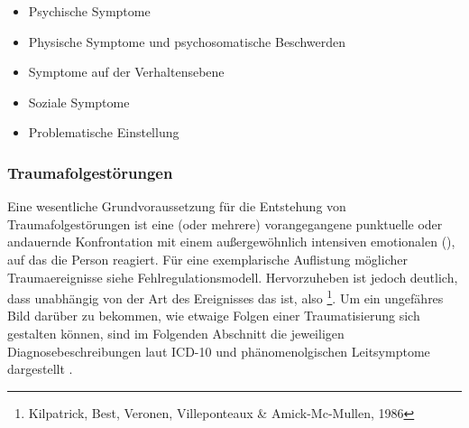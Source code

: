 {
\begin{itemize}
  \item {Psychische Symptome}
  \item {Physische Symptome und psychosomatische Beschwerden}
  \item {Symptome auf der Verhaltensebene}
  \item {Soziale Symptome}
  \item {Problematische Einstellung}
\end{itemize}
}
{}
{}
{}




\subsubsection{Traumafolgestörungen}


\Text{\TxBeschreibung}
{Eine wesentliche Grundvoraussetzung für die Entstehung von
Traumafolgestörungen ist eine (oder mehrere) vorangegangene
punktuelle oder andauernde Konfrontation mit einem
außergewöhnlich intensiven emotionalen
 (), auf das die Person  reagiert. 
Für eine
exemplarische Auflistung möglicher Traumaereignisse siehe
Fehlregulationsmodell. 
Hervorzuheben ist jedoch deutlich,
dass  unabhängig von der Art des Ereignisses das
 ist,
also \footnote{Kilpatrick, Best,
Veronen, Villeponteaux \& Amick-Mc-Mullen, 1986}. Um ein
ungefähres Bild darüber zu bekommen, wie etwaige Folgen einer
Traumatisierung sich gestalten können, sind im Folgenden
Abschnitt die jeweiligen Diagnosebeschreibungen laut ICD-10
und phänomenolgischen Leitsymptome dargestellt
\cite{ICD10-De-2011}.}
{}
{}
{}
{}





